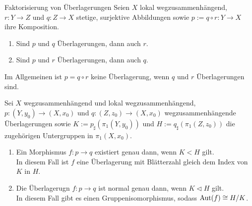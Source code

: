 \begin{Satz}{Faktorisierung von Überlagerungen}
    Seien $X$ lokal wegzusammenhängend, $r\colon Y \rightarrow Z$ und
    $q\colon Z \rightarrow X$ stetige, surjektive Abbildungen sowie
    $p := q \circ r\colon Y \rightarrow X$ ihre Komposition. 
    \begin{enumerate}
        \item
        Sind $p$ und $q$ Überlagerungen, dann auch $r$.
        
        \item
        Sind $p$ und $r$ Überlagerungen, dann auch $q$.
    \end{enumerate}
\end{Satz}

\begin{Bem}
    Im Allgemeinen ist $p = q \circ r$ keine Überlagerung, wenn
    $q$ und $r$ Überlagerungen sind.
\end{Bem}

\begin{Kor}
    Sei $X$ wegzusammenhängend und lokal wegzusammenhängend,\\
    $p\colon (Y, y_0) \rightarrow (X, x_0)$ und
    $q\colon (Z, z_0) \rightarrow (X, x_0)$ wegzusammenhängende Überlagerungen
    sowie $K := p_\sharp(\pi_1(Y, y_0))$ und $H := q_\sharp(\pi_1(Z, z_0))$
    die zugehörigen Untergruppen in $\pi_1(X, x_0)$.
    \begin{enumerate}
        \item
        Ein Morphismus $f\colon p \rightarrow q$ existiert genau dann, wenn
        $K < H$ gilt. \\
        In diesem Fall ist $f$ eine Überlagerung mit Blätterzahl gleich dem
        Index von $K$ in $H$.
        
        \item
        Die Überlagerugn $f\colon p \rightarrow q$ ist normal genau dann, wenn
        $K \vartriangleleft H$ gilt. \\
        In diesem Fall gibt es einen Gruppenisomorphismus, sodass
        $\text{Aut}(f) \cong H/K$.
    \end{enumerate}
\end{Kor}

\linie

